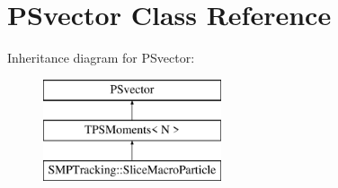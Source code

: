 \hypertarget{classPSvector}{}\section{P\+Svector Class Reference}
\label{classPSvector}
Inheritance diagram for P\+Svector\+:\begin{figure}[H]
\begin{center}
\leavevmode
\includegraphics[height=3.000000cm]{classPSvector}
\end{center}
\end{figure}
